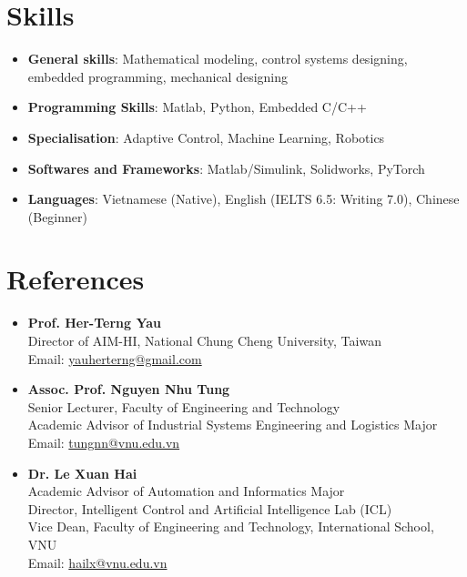 \documentclass[letterpaper,9pt]{extarticle}
\newcommand{\resumeItem}[2]{
  \item\small{
    \textbf{#1}{: #2 \vspace{-2pt}}
  }
}
\newcommand{\resumeSubItem}[2]{\resumeItem{#1}{#2}\vspace{-4pt}}
\newcommand{\resumeSubHeadingListStart}{\begin{itemize}[leftmargin=*, label={}]}
\newcommand{\resumeSubHeadingListEnd}{\end{itemize}}
\begin{document}
\section{Skills}
	\resumeSubHeadingListStart
	\resumeSubItem{General skills}{Mathematical modeling, control systems designing, embedded programming, mechanical designing}
	\resumeSubItem{Programming Skills}{Matlab, Python, Embedded C/C++}
    \resumeSubItem{Specialisation} {Adaptive Control, Machine Learning, Robotics}
    \resumeSubItem{Softwares and Frameworks} {Matlab/Simulink, Solidworks, PyTorch}
    \resumeSubItem{Languages} {Vietnamese (Native), English (IELTS 6.5: Writing 7.0), Chinese (Beginner)}
\resumeSubHeadingListEnd

\section{References}
          
\begin{itemize}[leftmargin=0.35cm]
    \item \textbf{Prof. Her-Terng Yau} \\ 
          Director of AIM-HI, National Chung Cheng University, Taiwan \\
          Email: \href{mailto:yauherterng@gmail.com}{yauherterng@gmail.com}
    \item \textbf{Assoc. Prof. Nguyen Nhu Tung} \\ 
          Senior Lecturer, Faculty of Engineering and Technology \\
          Academic Advisor of Industrial Systems Engineering and Logistics Major \\
          Email: \href{mailto:tungnn@vnu.edu.vn}{tungnn@vnu.edu.vn}

    \item \textbf{Dr. Le Xuan Hai}  \\
          Academic Advisor of Automation and Informatics Major \\
          Director, Intelligent Control and Artificial Intelligence Lab (ICL) \\
          Vice Dean, Faculty of Engineering and Technology, International School, VNU \\
          Email: \href{mailto:hailx@vnu.edu.vn}{hailx@vnu.edu.vn}
\end{itemize}
\end{document}
